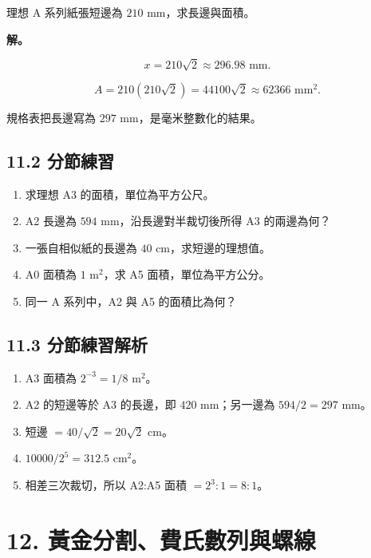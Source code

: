 \documentclass[11pt,a4paper]{article}
\providecommand{\tightlist}{%
  \setlength{\itemsep}{0pt}\setlength{\parskip}{0pt}}
\begin{document}
理想 A 系列紙張短邊為 \(210\text{ mm}\)，求長邊與面積。

\textbf{解。}

\[
x=210\sqrt2\approx296.98\text{ mm}.
\]

\[
A=210(210\sqrt2)=44100\sqrt2\approx62366\text{ mm}^2.
\]

規格表把長邊寫為 \(297\text{ mm}\)，是毫米整數化的結果。

\subsection{11.2 分節練習}\label{ux5206ux7bc0ux7df4ux7fd2-10}

\begin{enumerate}
\def\labelenumi{\arabic{enumi}.}
\tightlist
\item
  求理想 A3 的面積，單位為平方公尺。
\item
  A2 長邊為 \(594\text{ mm}\)，沿長邊對半裁切後所得 A3 的兩邊為何？
\item
  一張自相似紙的長邊為 \(40\text{ cm}\)，求短邊的理想值。
\item
  A0 面積為 \(1\text{ m}^2\)，求 A5 面積，單位為平方公分。
\item
  同一 A 系列中，A2 與 A5 的面積比為何？
\end{enumerate}

\subsection{11.3 分節練習解析}\label{ux5206ux7bc0ux7df4ux7fd2ux89e3ux6790-10}

\begin{enumerate}
\def\labelenumi{\arabic{enumi}.}
\tightlist
\item
  A3 面積為 \(2^{-3}=1/8\text{ m}^2\)。
\item
  A2 的短邊等於 A3 的長邊，即 \(420\text{ mm}\)；另一邊為 \(594/2=297\text{ mm}\)。
\item
  短邊 \(=40/\sqrt2=20\sqrt2\text{ cm}\)。
\item
  \(10000/2^5=312.5\text{ cm}^2\)。
\item
  相差三次裁切，所以 A2:A5 面積 \(=2^3:1=8:1\)。
\end{enumerate}

\section{12. 黃金分割、費氏數列與螺線}\label{ux9ec3ux91d1ux5206ux5272ux8cbbux6c0fux6578ux5217ux8207ux87baux7dda}
\end{document}
